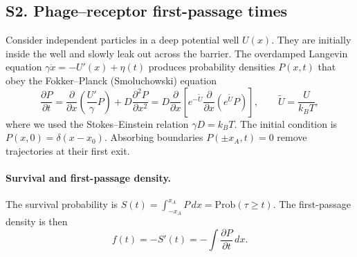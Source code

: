 \subsection*{S2. Phage--receptor first-passage times}
Consider independent particles in a deep potential well $U(x)$. They are initially inside the well and slowly leak out across the barrier. The overdamped Langevin equation $\gamma\dot x=-U'(x)+\eta(t)$ produces probability densities $P(x,t)$ that obey the Fokker--Planck (Smoluchowski) equation
\begin{equation}
\frac{\partial P}{\partial t}=\frac{\partial}{\partial x}\left(\frac{U'}{\gamma}P\right)+D\frac{\partial^2P}{\partial x^2}
= D\frac{\partial}{\partial x}\left[e^{-\tilde U}\frac{\partial}{\partial x}\left(e^{\tilde U}P\right)\right],\qquad \tilde U=\frac{U}{k_BT},
\end{equation}
where we used the Stokes--Einstein relation $\gamma D=k_BT$. The initial condition is $P(x,0)=\delta(x-x_0)$. Absorbing boundaries $P(\pm x_A,t)=0$ remove trajectories at their first exit.

\paragraph{Survival and first-passage density.} The survival probability is $S(t)=\int_{-x_A}^{x_A}P\,dx=\mathrm{Prob}(\tau\ge t)$. The first-passage density is then
\begin{equation}
f(t)=-S'(t)=-\int\frac{\partial P}{\partial t}\,dx .
\end{equation}

